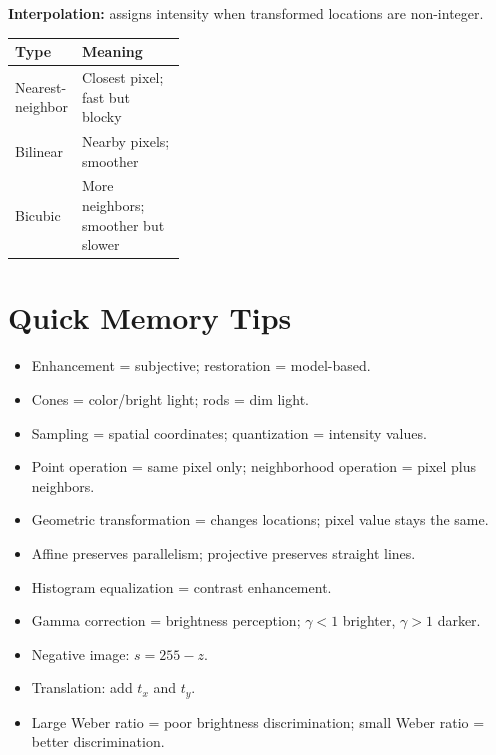 \documentclass[8pt]{extarticle}
\begin{document}
\begin{multicols}{2}
\textbf{Interpolation:} assigns intensity when transformed locations are non-integer.

\begin{tabularx}{\linewidth}{@{}p{0.34\linewidth}Y@{}}
\toprule
\textbf{Type} & \textbf{Meaning} \\
\midrule
Nearest-neighbor & Closest pixel; fast but blocky \\
Bilinear & Nearby pixels; smoother \\
Bicubic & More neighbors; smoother but slower \\
\bottomrule
\end{tabularx}

\section{Quick Memory Tips}

\begin{itemize}
    \item Enhancement = subjective; restoration = model-based.
    \item Cones = color/bright light; rods = dim light.
    \item Sampling = spatial coordinates; quantization = intensity values.
    \item Point operation = same pixel only; neighborhood operation = pixel plus neighbors.
    \item Geometric transformation = changes locations; pixel value stays the same.
    \item Affine preserves parallelism; projective preserves straight lines.
    \item Histogram equalization = contrast enhancement.
    \item Gamma correction = brightness perception; $\gamma<1$ brighter, $\gamma>1$ darker.
    \item Negative image: $s=255-z$.
    \item Translation: add $t_x$ and $t_y$.
    \item Large Weber ratio = poor brightness discrimination; small Weber ratio = better discrimination.
\end{itemize}

\end{multicols}
\end{document}
